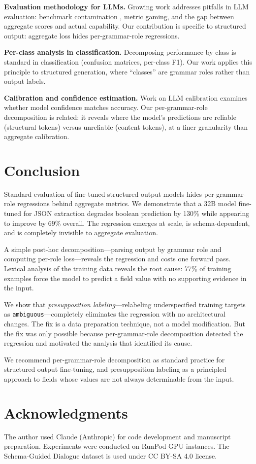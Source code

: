 \documentclass[11pt]{article}
\begin{document}
\textbf{Evaluation methodology for LLMs.} Growing work addresses pitfalls in LLM evaluation: benchmark contamination \cite{jacovi2023contamination}, metric gaming, and the gap between aggregate scores and actual capability. Our contribution is specific to structured output: aggregate loss hides per-grammar-role regressions.

\textbf{Per-class analysis in classification.} Decomposing performance by class is standard in classification (confusion matrices, per-class F1). Our work applies this principle to structured generation, where ``classes'' are grammar roles rather than output labels.

\textbf{Calibration and confidence estimation.} Work on LLM calibration \cite{kadavath2022calibration} examines whether model confidence matches accuracy. Our per-grammar-role decomposition is related: it reveals where the model's predictions are reliable (structural tokens) versus unreliable (content tokens), at a finer granularity than aggregate calibration.

\section{Conclusion}

Standard evaluation of fine-tuned structured output models hides per-grammar-role regressions behind aggregate metrics. We demonstrate that a 32B model fine-tuned for JSON extraction degrades boolean prediction by 130\% while appearing to improve by 69\% overall. The regression emerges at scale, is schema-dependent, and is completely invisible to aggregate evaluation.

A simple post-hoc decomposition---parsing output by grammar role and computing per-role loss---reveals the regression and costs one forward pass. Lexical analysis of the training data reveals the root cause: 77\% of training examples force the model to predict a field value with no supporting evidence in the input.

We show that \emph{presupposition labeling}---relabeling underspecified training targets as \texttt{ambiguous}---completely eliminates the regression with no architectural changes. The fix is a data preparation technique, not a model modification. But the fix was only possible because per-grammar-role decomposition detected the regression and motivated the analysis that identified its cause.

We recommend per-grammar-role decomposition as standard practice for structured output fine-tuning, and presupposition labeling as a principled approach to fields whose values are not always determinable from the input.

\section*{Acknowledgments}

The author used Claude (Anthropic) for code development and manuscript preparation. Experiments were conducted on RunPod GPU instances. The Schema-Guided Dialogue dataset \cite{rastogi2020sgd} is used under CC BY-SA 4.0 license.



\end{document}

